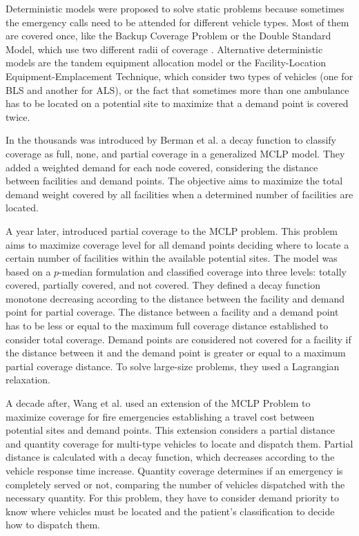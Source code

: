 Deterministic models were proposed to solve static problems because sometimes the emergency calls need to be attended for different vehicle types. Most of them are covered once, like the Backup Coverage Problem or the Double Standard Model, which use two different radii of coverage \cite{li2011covering}. Alternative deterministic models are the tandem equipment allocation model or the Facility-Location Equipment-Emplacement Technique, which consider two types of vehicles (one for BLS and another for ALS), or the fact that sometimes more than one ambulance has to be located on a potential site to maximize that a demand point is covered twice. 

In the thousands was introduced by Berman et al. \cite{berman2003gradual} a decay function to classify coverage as full, none, and partial coverage in a generalized MCLP model. They added a weighted demand for each node covered, considering the distance between facilities and demand points. The objective aims to maximize the total demand weight covered by all facilities when a determined number of facilities are located.

A year later, \citet{karasakal2004maximal} introduced partial coverage to the MCLP problem. This problem aims to maximize coverage level for all demand points deciding where to locate a certain number of facilities within the available potential sites. The model was based on a $p$-median formulation and classified coverage into three levels: totally covered, partially covered, and not covered. They defined a decay function monotone decreasing according to the distance between the facility and demand point for partial coverage. The distance between a facility and a demand point has to be less or equal to the maximum full coverage distance established to consider total coverage. Demand points are considered not covered for a facility if the distance between it and the demand point is greater or equal to a maximum partial coverage distance. To solve large-size problems, they used a Lagrangian relaxation.

A decade after, Wang et al. \cite{wang2016new} used an extension of the MCLP Problem to maximize coverage for fire emergencies establishing a travel cost between potential sites and demand points. This extension considers a partial distance and quantity coverage for multi-type vehicles to locate and dispatch them. Partial distance is calculated with a decay function, which decreases according to the vehicle response time increase. Quantity coverage determines if an emergency is completely served or not, comparing the number of vehicles dispatched with the necessary quantity. For this problem, they have to consider demand priority to know where vehicles must be located and the patient's classification to decide how to dispatch them.

